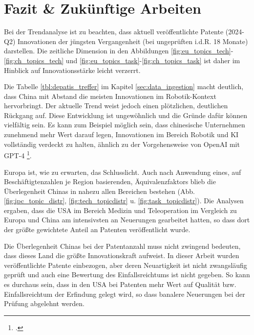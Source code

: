\newpage
\section{Fazit \& Zukünftige Arbeiten}
Bei der Trendanalyse ist zu beachten, dass aktuell veröffentlichte Patente (2024-Q2) Innovationen der jüngsten Vergangenheit (bei ungeprüften i.d.R. 18 Monate) darstellen. Die zeitliche Dimension in den Abbildungen \ref{fig:eu_topics_tech}-\ref{fig:ch_topics_tech} und \ref{fig:eu_topics_task}-\ref{fig:ch_topics_task} ist daher im Hinblick auf Innovationsstärke leicht verzerrt.

Die Tabelle \ref{tbl:depatis_treffer} im Kapitel \ref{sec:data_ingestion} macht deutlich, dass China mit Abstand die meisten Innovationen im Robotik-Kontext hervorbringt. Der aktuelle Trend weist jedoch einen plötzlichen, deutlichen Rückgang auf. Diese Entwicklung ist ungewöhnlich und die Gründe dafür können vielfältig sein. Es kann zum Beispiel möglich sein, dass chinesische Unternehmen zunehmend mehr Wert darauf legen, Innovationen im Bereich Robotik und KI vollständig verdeckt zu halten, ähnlich zu der Vorgehensweise von OpenAI mit GPT-4 \footcite{vincent2023openai}.

Europa ist, wie zu erwarten, das Schlusslicht. Auch nach Anwendung eines, auf Beschäftigtenzahlen je Region basierenden, Äquivalenzfaktors blieb die Überlegenheit Chinas in nahezu allen Bereichen bestehen (Abb. \ref{fig:ipc_topic_distr}, \ref{fig:tech_topicdistr} u. \ref{fig:task_topicdistr}). 
Die Analysen ergaben, dass die USA im Bereich Medizin und Teleoperation im Vergleich zu Europa und China am intensivsten an Neuerungen gearbeitet hatten, so dass dort der größte gewichtete Anteil an Patenten veröffentlicht wurde.

Die Überlegenheit Chinas bei der Patentanzahl muss nicht zwingend bedeuten, dass dieses Land die größte Innovationskraft aufweist. In dieser Arbeit wurden veröffentlichte Patente einbezogen, aber deren Neuartigkeit ist nicht zwangsläufig geprüft und auch eine Bewertung des Einfallsreichtums ist nicht gegeben. So kann es durchaus sein, dass in den USA bei Patenten mehr Wert auf Qualität bzw. Einfallsreichtum der Erfindung gelegt wird, so dass banalere Neuerungen bei der Prüfung abgelehnt werden.